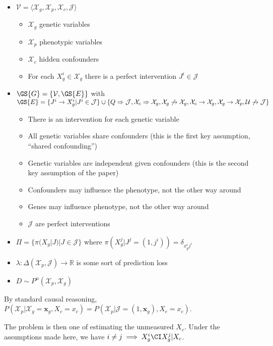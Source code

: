 \begin{itemize}
    \item $\mathcal{V}=\langle \mathcal{X}_{g}, \mathcal{X}_{p}, \mathcal{X}_{c},\mathcal{J}\rangle$
    \begin{itemize}
        \item $\mathcal{X}_g$ genetic variables
        \item $\mathcal{X}_p$ phenotypic variables
        \item $\mathcal{X}_c$ hidden confounders
        \item For each $X_g^i\in \mathcal{X}_g$ there is a perfect intervention $J^i\in\mathcal{J}$
    \end{itemize}
  \item $\GS{G}=\{\mathcal{V},\GS{E}\}$ with $\GS{E}=\{J^i\to X_g^i|J^i\in \mathcal{J}\}\cup \{Q\Rightarrow\mathcal{J}, \mathcal{X}_c\Rightarrow \mathcal{X}_g, \mathcal{X}_g\not\rightarrow \mathcal{X}_g, \mathcal{X}_c\rightarrow \mathcal{X}_g, \mathcal{X}_g\rightarrow \mathcal{X}_p, \mathcal{U} \not\to \mathcal{J}\}$
  \begin{itemize}
      \item There is an intervention for each genetic variable
      \item All genetic variables share confounders (this is the first key assumption,  ``shared confounding'')
      \item Genetic variables are independent given confounders (this is the second key assumption of the paper)
      \item Confounders may influence the phenotype, not the other way around
      \item Genes may influence phenotype, not the other way around
      \item $\mathcal{J}$ are perfect interventions
  \end{itemize}
  \item $\Pi=\{\pi(X_g|J)|J\in \mathcal{J} \}$ where $\pi(X^j_g|J^j=(1,j^i))=\delta_{x^i_g j^i}$
  \item $\lambda:\Delta(\mathcal{X}_p,\mathcal{J})\to\mathbb{R}$ is some sort of prediction loss
  \item $D\sim P^\mu(\mathcal{X}_p,\mathcal{X}_g)$
\end{itemize}


By standard causal reasoning, $P(\mathcal{X}_p|\mathcal{X}_g=\mathbf{x}_g,X_c=x_c) = P(\mathcal{X}_p|\mathcal{J}=(1,\mathbf{x}_g),X_c=x_c)$.

The problem is then one of estimating the unmeasured $X_c$. Under the assumptions made here, we have $i\neq j\implies X^i_g \CI X^j_g | X_c$. 

